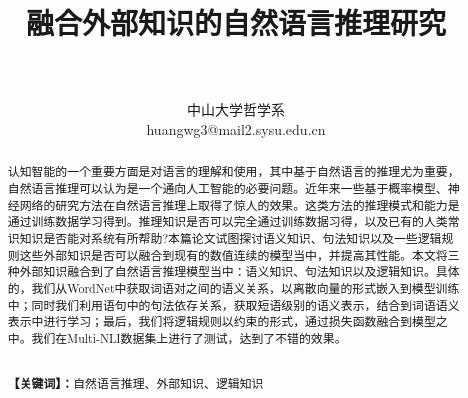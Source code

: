 \documentclass[UTF8,11pt,a4paper,nofonts]{ctexart}
\title{\zihao{3}\textbf{融合外部知识的自然语言推理研究}}
\date{\quad}
\author{\vspace{-0.5em}\zihao{-4}{黄文冠 }\\ 
\vspace{-0.5em}\zihao{-4}{指导老师：鲜于波}\\ 
\vspace{-0.5em}\zihao{5}中山大学哲学系\\
\zihao{5}huangwg3@mail2.sysu.edu.cn}
\begin{document}
\setlength{\parskip}{0pt}
\linespread{1.6}

\maketitle
\thispagestyle{empty}


\begin{abstract}
{

认知智能的一个重要方面是对语言的理解和使用，其中基于自然语言的推理尤为重要，自然语言推理可以认为是一个通向人工智能的必要问题。近年来一些基于概率模型、神经网络的研究方法在自然语言推理上取得了惊人的效果。这类方法的推理模式和能力是通过训练数据学习得到。推理知识是否可以完全通过训练数据习得，以及已有的人类常识知识是否能对系统有所帮助?本篇论文试图探讨语义知识、句法知识以及一些逻辑规则这些外部知识是否可以融合到现有的数值连续的模型当中，并提高其性能。本文将三种外部知识融合到了自然语言推理模型当中：语义知识、句法知识以及逻辑知识。具体的，我们从WordNet中获取词语对之间的语义关系，以离散向量的形式嵌入到模型训练中；同时我们利用语句中的句法依存关系，获取短语级别的语义表示，结合到词语语义表示中进行学习；最后，我们将逻辑规则以约束的形式，通过损失函数融合到模型之中。我们在Multi-NLI数据集上进行了测试，达到了不错的效果。%
}\\
\textbf{{【关键词】：}}{自然语言推理、外部知识、逻辑知识}
\end{abstract}
\end{document}
